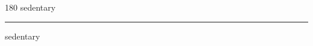 
\begin{frame}
\begin{center}
\begin{turn}{180}
{\fontsize{2.5cm}{1em}\selectfont sedentary}
\end{turn}
\vspace{1em}\par  
\hrule
\vspace{1em}\par  
{\fontsize{2.5cm}{1em}\selectfont sedentary}
\end{center}
\end{frame}
